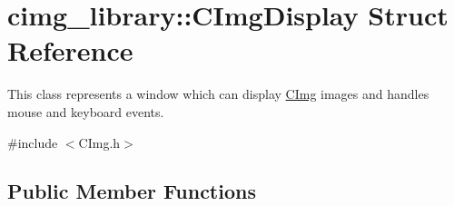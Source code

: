 \hypertarget{structcimg__library_1_1_c_img_display}{\section{cimg\-\_\-library\-:\-:C\-Img\-Display Struct Reference}
\label{structcimg__library_1_1_c_img_display}
}


This class represents a window which can display \hyperlink{structcimg__library_1_1_c_img}{C\-Img} images and handles mouse and keyboard events.  




{\ttfamily \#include $<$C\-Img.\-h$>$}

\subsection*{Public Member Functions}
